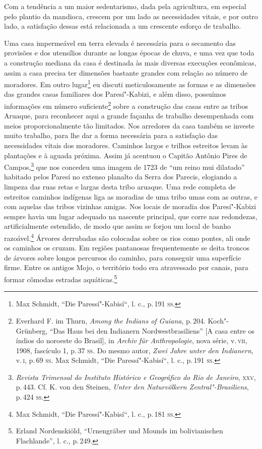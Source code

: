Com a tendência a um maior sedentarismo, dada pela agricultura, em
especial pelo plantio da mandioca, crescem por um lado as necessidades
vitais, e por outro lado, a satisfação dessas está relacionada a um
crescente esforço de trabalho.

Uma casa impermeável em terra elevada é necessária para o secamento das
provisões e dos utensílios durante as longas épocas de chuva, e uma vez
que toda a construção mediana da casa é destinada às mais diversas
execuções econômicas, assim a casa precisa ter dimensões bastante
grandes com relação ao número de moradores. Em outro lugar\footnote{Max
  Schmidt, ``Die Paressí"-Kabisí``, l. c., p.\,191 \textsc{ss}.} eu discuti
meticulosamente as formas e as dimensões das grandes casas familiares
dos Paresí"-Kabizi, e além disso, possuímos informações em número
suficiente\footnote{Everhard F. im Thurn, \textit{Among the Indians of
  Guiana}, p.\,204. Koch"-Grünberg, ``Das Haus bei den Indianern
  Nordwestbrasiliens'' {[}A casa entre os índios do noroeste do
  Brasil{]}, in \textit{Archiv für Anthropologie}, nova série, v.\,\textsc{vii},
  1908, fascículo 1, p.\,37 \textsc{ss}. Do mesmo autor, \textit{Zwei Jahre unter
  den Indianern}, v.\,\textsc{i}, p.\,69 \textsc{ss}. Max Schmidt, ``Die Paressí"-Kabisí``,
  l. c., p.\,191 \textsc{ss}.} sobre a construção das casas entre as tribos
Aruaque, para reconhecer aqui a grande façanha de trabalho desempenhada
com meios proporcionalmente tão limitados. Nos arredores da casa também
se investe muito trabalho, para lhe dar a forma necessária para a
satisfação das necessidades vitais dos moradores. Caminhos largos e
trilhos estreitos levam às plantações e à aguada próxima. Assim já
acentuou o Capitão Antônio Pires de Campos,\footnote{\textit{Revista
  Trimensal do Instituto Histórico e Geográfico do Rio de Janeiro}, \textsc{xxv},
  p.\,443. Cf. K. von den Steinen, \textit{Unter den Naturvölkern
  Zentral"-Brasiliens}, p.\,424 \textsc{ss}.} que nos concedeu uma imagem de 1723
de ``um reino mui dilatado'' habitado pelos Paresí no extenso planalto
da Serra dos Parecis, elogiando a limpeza das ruas retas e largas desta
tribo aruaque. Uma rede completa de estreitos caminhos indígenas liga as
moradias de uma tribo umas com as outras, e com aquelas das tribos
vizinhas amigas. Nos locais de moradia dos Paresí"-Kabizi sempre havia um
lugar adequado na nascente principal, que corre nas redondezas,
artificialmente estendido, de modo que assim se forjou um local de banho
razoável.\footnote{Max Schmidt, ``Die Paressí"-Kabisí``, l. c., p.\,181 \textsc{ss}.}
Árvores derrubadas são colocadas sobre os rios como pontes, ali onde os
caminhos os cruzam. Em regiões pantanosas frequentemente se deita
troncos de árvores sobre longos percursos do caminho, para conseguir uma
superfície firme. Entre os antigos Mojo, o território todo era
atravessado por canais, para formar cômodas estradas aquáticas.\footnote{Erland
  Nordenskiöld, ``Urnengräber und Mounds im bolivianischen Flachlande'',
  l. c., p.\,249.}

